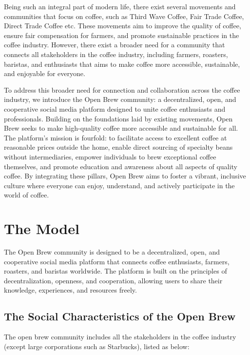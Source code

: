 \documentclass[12pt]{article}
\begin{document}
Being such an integral part of modern life, there exist several movements and communities that focus on coffee, such as Third Wave Coffee, Fair Trade Coffee, Direct Trade Coffee etc. These movements aim to improve the quality of coffee, ensure fair compensation for farmers, and promote sustainable practices in the coffee industry. However, there exist a broader need for a community that connects all stakeholders in the coffee industry, including farmers, roasters, baristas, and enthusiasts that aims to make coffee more accessible, sustainable, and enjoyable for everyone.

To address this broader need for connection and collaboration across the coffee industry, we introduce the Open Brew community: a decentralized, open, and cooperative social media platform designed to unite coffee enthusiasts and professionals. Building on the foundations laid by existing movements, Open Brew seeks to make high-quality coffee more accessible and sustainable for all. The platform's mission is fourfold: to facilitate access to excellent coffee at reasonable prices outside the home, enable direct sourcing of specialty beans without intermediaries, empower individuals to brew exceptional coffee themselves, and promote education and awareness about all aspects of quality coffee. By integrating these pillars, Open Brew aims to foster a vibrant, inclusive culture where everyone can enjoy, understand, and actively participate in the world of coffee.

\section{The Model}
\label{section:the_model}
The Open Brew community is designed to be a decentralized, open, and cooperative social media platform that connects coffee enthusiasts, farmers, roasters, and baristas worldwide. The platform is built on the principles of decentralization, openness, and cooperation, allowing users to share their knowledge, experiences, and resources freely.

\subsection{The Social Characteristics of the Open Brew}
\label{subsection:social_characteristics_of_the_open_brew}
The open brew community includes all the stakeholders in the coffee industry (except large corporations such as Starbucks), listed as below:
\end{document}

